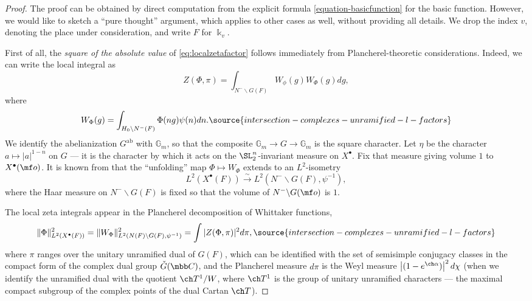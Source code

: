\begin{proof}
The proof can be obtained by direct computation from the explicit formula \eqref{equation-basicfunction} for the basic function. However, we would like to sketch a ``pure thought'' argument, which applies to other cases as well, without providing all details.
We drop the index $v$, denoting the place under consideration, and write $F$ for $\Bbbk_v$.

First of all, the \emph{square of the absolute value} of \eqref{eq:localzetafactor} follows immediately from Plancherel-theoretic considerations. Indeed, we can write the local integral as
 \[    Z(\Phi, \pi)=  \int_{N^-\backslash G (F)} W_{\phi}(g) W_{\Phi}(g)  dg,\]
 where
 \begin{equation}\label{unfolding} W_{\Phi}(g) = \int_{H_0\backslash N^-(F)} \Phi(ng)\psi(n) dn.
\source{intersection-complexes-unramified-l-factors}
 \end{equation}
 We identify the abelianization $G^{\text{ab}}$ with $\mathbb G_m$, so that the composite $\mathbb G_m\to G\to\mathbb G_m$ is the square character.
 Let $\eta$ be the character $a\mapsto |a|^{1-n}$ on $G$ --- it is the character by which it acts on the $\SL_2^n$-invariant measure on $X^\bullet$. Fix that measure giving volume $1$ to $X^\bullet(\mf o)$.
 It is known from \cite[Theorem 9.5.9]{SV} that the ``unfolding'' map $\Phi \mapsto W_{\Phi}$ extends to an $L^2$-isometry
 \[ L^2(X^\bullet(F)) \xrightarrow\sim L^2(N^-\backslash G(F), \psi^{-1}),\]
 where the Haar measure on $N^-\backslash G(F)$ is fixed so that the volume of $N^-\backslash G(\mf o)$ is $1$.

 The local zeta integrals appear in the Plancherel decomposition of Whittaker functions,  \begin{equation}\label{eq:PlancherelWhittaker} \Vert \Phi\Vert^2_{L^2(X^\bullet(F))} = \Vert W_{\Phi}\Vert^2_{L^2(N(F)\backslash G(F), \psi^{-1})} = \int |Z(\Phi, \pi)|^2 d\pi,
\source{intersection-complexes-unramified-l-factors}
 \end{equation}
  where $\pi$ ranges over the unitary unramified dual of $G(F)$, which can be identified with the set of semisimple conjugacy classes in the compact form of the complex dual group $\check G(\mbb C)$, and the Plancherel measure $d\pi$ is the Weyl measure $\left|(1-e^{\ch\alpha})\right|^2 d\chi$ (when we identify the unramified dual with the quotient $\ch T^1/W$, where $\ch T^1$ is the group of unitary unramified characters --- the maximal compact subgroup of the complex points of the dual Cartan $\ch T$).


\end{proof}
